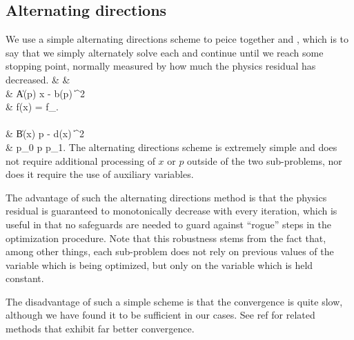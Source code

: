 \subsection{Alternating directions}
We use a simple alternating directions scheme 
    to peice together  and ,
    which is to say that we simply
    alternately solve each and continue until we reach some stopping point,
    normally measured by how much the physics residual has decreased.
\BA {} & & \notag \\ 
&  \| A(p) x - b(p) \|^2 \notag \\
 &    \subto f(x) = f_. \notag \\ 
    \\
&  \| B(x) p - d(x) \|^2 \notag \\
    & \subto p_0 \le p \le p_1. \notag \EA
The alternating directions scheme is extremely simple
    and does not require additional processing
    of $x$ or $p$ outside of the two sub-problems,
    nor does it require the use of auxiliary variables.

The advantage of such the alternating directions method
    is that the physics residual is guaranteed to
    monotonically decrease with every iteration,
    which is useful in that no safeguards
    are needed to guard against ``rogue'' steps
    in the optimization procedure.
Note that this robustness stems from the fact that,
    among other things,
    each sub-problem does not rely on previous values of 
    the variable which is being optimized,
    but only on the variable which is held constant.

The disadvantage of such a simple scheme is that 
    the convergence is quite slow,
    although we have found it to be sufficient in our cases.
See ref %
    for related methods that exhibit far better convergence.
